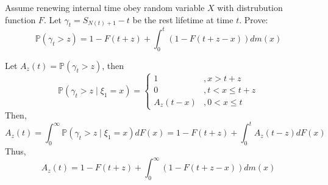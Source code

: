 \documentclass{ctexart}
\begin{document}
\begin{problem}\label{pro:3}
  Assume renewing internal time obey random variable \(X\) with distrubution function \(F\).
  Let \(\gamma_t=S_{N(t) + 1}-t\) be the rest lifetime at time \(t\).
  Prove: \[
    \mathbb{P}(\gamma_t > z)=1-F(t + z) + \int_{0}^t(1-F(t + z -x))d m(x)
  \]
\end{problem}
\begin{solution}
  Let \(A_z(t)=\mathbb{P}(\gamma_t > z)\), then \[
    \mathbb{P}(\gamma_t > z \mid \xi_1=x)=\begin{cases}
      1        & ,x > t + z         \\
      0        & , t < x \leq t + z \\
      A_z(t-x) & , 0 < x \leq t
    \end{cases}
  \]
  Then,
  \[
    A_z(t)=\int_{0}^\infty \mathbb{P}(\gamma_t > z \mid \xi_1=x)d F(x)=1-F(t + z) + \int_{0}^tA_z(t-z)dF(x)
  \]
  Thus, \[
    A_z(t)=1-F(t + z) + \int_{0}^\infty(1-F(t + z -x))dm(x)
  \]
\end{solution}
\end{document}
